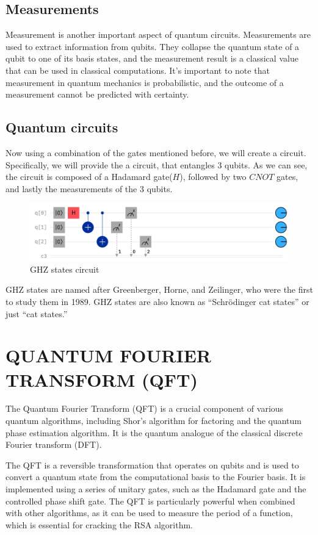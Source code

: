 \documentclass[inscr,ack,preface]{diphdthesis}
\begin{document}
\section{Measurements}

Measurement is another important aspect of quantum circuits. Measurements are used to extract information from qubits. They collapse the quantum state of a qubit to one of its basis states, and the measurement result is a classical value that can be used in classical computations. It's important to note that measurement in quantum mechanics is probabilistic, and the outcome of a measurement cannot be predicted with certainty.

\section{Quantum circuits}

Now using a combination of the gates mentioned before, we will create a circuit. Specifically, we will provide the a circuit, that entangles 3 qubits. As we can see, the circuit is composed of a Hadamard gate($H$), followed by two $CNOT$ gates, and lastly the measurements of the 3 qubits. \cite{ibm}
\begin{figure}[ht]
    \includegraphics[width=1\textwidth]{ghz.png}
    \caption{GHZ states circuit}
    \label{fig:enter-label}
\end{figure}

GHZ states are named after Greenberger, Horne, and Zeilinger, who were the first to study them in 1989. GHZ states are also known as “Schrödinger cat states” or just “cat states.” \cite{ghz_ibm}

\chapter{QUANTUM FOURIER TRANSFORM (QFT)}

The Quantum Fourier Transform (QFT) is a crucial component of various quantum algorithms, including Shor's algorithm for factoring and the quantum phase estimation algorithm. It is the quantum analogue of the classical discrete Fourier transform (DFT).

The QFT is a reversible transformation that operates on qubits and is used to convert a quantum state from the computational basis to the Fourier basis. It is implemented using a series of unitary gates, such as the Hadamard gate and the controlled phase shift gate. The QFT is particularly powerful when combined with other algorithms, as it can be used to measure the period of a function, which is essential for cracking the RSA algorithm.
\end{document}
